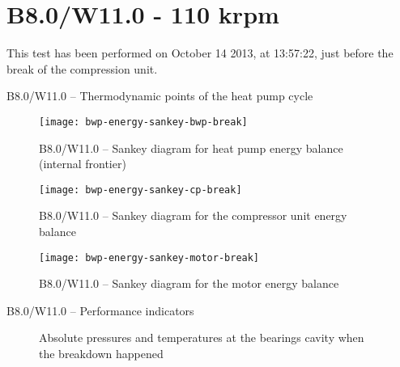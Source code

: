
\section{B8.0/W11.0 - 110 krpm}
\label{sec:bwp-exp-details-B8.0/W11.0}

This test has been performed on October 14\th{} 2013, at 13:57:22,
just before the break of the compression unit.

\begin{table}[htbp]
  \footnotesize
  \begin{center}
    
  \end{center}
  \caption{B8.0/W11.0 -- Thermodynamic points of the heat pump cycle}
  \label{tab:B8.0/W11.0-PThs}
\end{table}

\begin{figure}[htbp]
  \centering
  \texttt{[image: bwp-energy-sankey-bwp-break]}
  \caption{B8.0/W11.0 -- Sankey diagram for heat pump energy balance (internal frontier)}
  \label{fig:bwp-B8.0/W11.0-sankey-energy}
\end{figure}


\begin{figure}[htbp]
  \centering
  \texttt{[image: bwp-energy-sankey-cp-break]}
  \caption{B8.0/W11.0 -- Sankey diagram for the compressor unit energy balance}
  \label{fig:bwp-B8.0/W11.0-sankey-cp}
\end{figure}


\begin{figure}[htbp]
  \centering
  \texttt{[image: bwp-energy-sankey-motor-break]}
  \caption{B8.0/W11.0 -- Sankey diagram for the motor energy balance}
  \label{fig:bwp-B8.0/W11.0-sankey-motor}
\end{figure}

\begin{table}[htbp]
    \footnotesize
    \begin{center}
    
  \end{center}
  \caption{B8.0/W11.0 -- Performance indicators}
\end{table}

\begin{figure}[htbp]
  \centering
  \hspace{1em}
  \caption{Absolute pressures and temperatures at the bearings cavity when the breakdown happened}
  \label{fig:bwp-bearings-P-T}
\end{figure}

